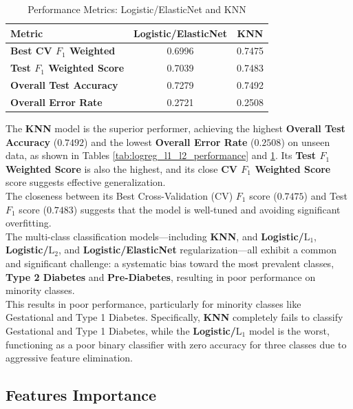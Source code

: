 \documentclass[conference]{IEEEtran}
\begin{document}
\begin{table}[h!]
	\centering
	\caption{Performance Metrics: Logistic/ElasticNet and KNN}
	\label{tab:elasticnet_knn_performance}
	\begin{tabular}{|l|c|c|}
		\hline
		\textbf{Metric} & \textbf{Logistic/ElasticNet} & \textbf{KNN} \\
		\hline
		\textbf{Best CV $F_1$ Weighted} & 0.6996 & 0.7475 \\
		\hline
		\textbf{Test $F_1$ Weighted Score} & 0.7039 & 0.7483 \\
		\hline
		\textbf{Overall Test Accuracy} & 0.7279 & 0.7492 \\
		\hline
		\textbf{Overall Error Rate} & 0.2721 & 0.2508 \\
		\hline
	\end{tabular}
\end{table}

\indent The \textbf{KNN} model is the superior performer, achieving the highest \textbf{Overall Test Accuracy} ($\mathbf{0.7492}$) and the lowest \textbf{Overall Error Rate} ($\mathbf{0.2508}$) on unseen data, as shown in Tables \ref{tab:logreg_l1_l2_performance} and \ref{tab:elasticnet_knn_performance}. Its \textbf{Test $F_1$ Weighted Score} is also the highest, and its close \textbf{CV $F_1$ Weighted Score} score suggests effective generalization.\\
\indent The closeness between its Best Cross-Validation ($\text{CV}$) $F_1$ score ($\mathbf{0.7475}$) and Test $F_1$ score ($\mathbf{0.7483}$) suggests that the model is well-tuned and avoiding significant overfitting.\\
\indent The multi-class classification models---including \textbf{KNN}, and \textbf{Logistic/$\text{L}_1$}, \textbf{Logistic/$\text{L}_2$}, and \textbf{Logistic/ElasticNet} regularization---all exhibit a common and significant challenge: a systematic bias toward the most prevalent classes, \textbf{Type 2 Diabetes} and \textbf{Pre-Diabetes}, resulting in poor performance on minority classes.\\
\indent This results in poor performance, particularly for minority classes like Gestational and Type 1 Diabetes. Specifically, \textbf{KNN} completely fails to classify Gestational and Type 1 Diabetes, while the \textbf{Logistic/$\text{L}_1$} model is the worst, functioning as a poor binary classifier with zero accuracy for three classes due to aggressive feature elimination.

\subsection{Features Importance}
\end{document}

